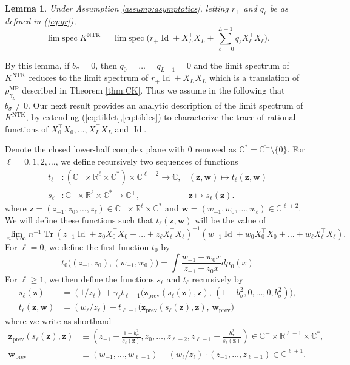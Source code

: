 \documentclass{article}
\newtheorem{lemma}[theorem]{Lemma}
\theoremstyle{definition}
\newcommand{\R}{\mathbb{R}}
\newcommand{\C}{\mathbb{C}}
\newcommand{\Id}{\operatorname{Id}}
\newcommand{\NTK}{\text{NTK}}
\newcommand{\MP}{\text{MP}}
\newcommand{\prev}{{\text{prev}}}
\newcommand{\Tr}{\operatorname{Tr}}
\newcommand{\z}{\mathbf{z}}
\newcommand{\w}{\mathbf{w}}
\newcommand{\1}{\mathbf{1}}
\newcommand{\limspec}{\operatorname{lim\;spec}}
\begin{document}
\begin{lemma}\label{lemma:NTKapprox}
Under Assumption \ref{assump:asymptotics}, letting $r_+$ and $q_\ell$ be as
defined in (\ref{eq:qr}),
\[\limspec K^\NTK=\limspec
\Big(r_+\Id+X_L^\top X_L+\sum_{\ell=0}^{L-1}
q_\ell X_\ell^\top X_\ell\Big).\]
\end{lemma}

By this lemma, if $b_\sigma=0$, then $q_0=\ldots=q_{L-1}=0$ and
the limit spectrum of $K^\NTK$ reduces to
the limit spectrum of $r_+\Id+X_L^\top X_L$ which is a translation of
$\rho_{\gamma_L}^{\MP}$
described in Theorem \ref{thm:CK}. Thus we assume in the following that
$b_\sigma \neq 0$. Our next result provides an analytic description of the limit spectrum of $K^\NTK$, by extending
(\ref{eq:tildet},\ref{eq:tildes}) to characterize
the trace of rational functions of $X_0^\top X_0,\ldots,X_L^\top X_L$ and $\Id$.

Denote the closed lower-half complex plane with 0 removed as
$\C^*=\overline{\C^-} \setminus \{0\}$.
For $\ell=0,1,2,\ldots$, we define recursively
two sequences of functions
\begin{align*}
t_\ell&:(\C^- \times \R^\ell \times \C^*) \times \C^{\ell+2} \to \C,
& (\z,\w) \mapsto t_\ell(\z,\w)\\
s_\ell&:\C^- \times \R^\ell \times \C^* \to \C^+,
& \z \mapsto s_\ell(\z).
\end{align*}
where $\z=(z_{-1},z_0,\ldots,z_\ell) \in \C^- \times \R^\ell \times \C^*$
and $\w=(w_{-1},w_0,\ldots,w_\ell) \in \C^{\ell+2}$.
We will define these functions such that $t_\ell(\z,\w)$ will be the value of
\[\lim_{n \to \infty} n^{-1}\Tr
(z_{-1}\Id+z_0 X_0^\top X_0+\ldots+z_\ell
X_\ell^\top X_\ell)^{-1}(w_{-1}\Id+w_0 X_0^\top X_0+\ldots+w_\ell
X_\ell^\top X_\ell).\]
For $\ell=0$, we define the first function $t_0$ by
\begin{equation}\label{eq:t0}
t_0\Big((z_{-1},z_0),(w_{-1},w_0)\Big)
=\int \frac{w_{-1}+w_0x}{z_{-1}+z_0x} d\mu_0(x)
\end{equation}
For $\ell \geq 1$, we then define the functions
$s_\ell$ and $t_\ell$ recursively by
\begin{align}
s_\ell(\z)&=(1/z_\ell)
+\gamma_\ell t_{\ell-1}\big(\z_\prev(s_\ell(\z),\z),\,(1-b_\sigma^2,0,
\ldots,0,b_\sigma^2)\big),\label{eq:sl}\\
t_\ell(\z,\w)&=(w_\ell/z_\ell)
+t_{\ell-1}\big(\z_\prev(s_\ell(\z),\z),\,\w_\prev\big)\label{eq:tl}
\end{align}
where we write as shorthand
\begin{align}
\z_\prev(s_\ell(\z),\z)
& \equiv \left(z_{-1}+\frac{1-b_\sigma^2}{s_\ell(\z)},
z_0,\ldots,z_{\ell-2},z_{\ell-1}+\frac{b_\sigma^2}{s_\ell(\z)}\right)
\in \C^- \times \R^{\ell-1} \times \C^*,\label{eq:zprev}\\
\w_\prev& \equiv (w_{-1},\ldots,w_{\ell-1})-(w_\ell/z_\ell) \cdot 
(z_{-1},\ldots,z_{\ell-1}) \in \C^{\ell+1}.\label{eq:wprev}
\end{align}
\end{document}
